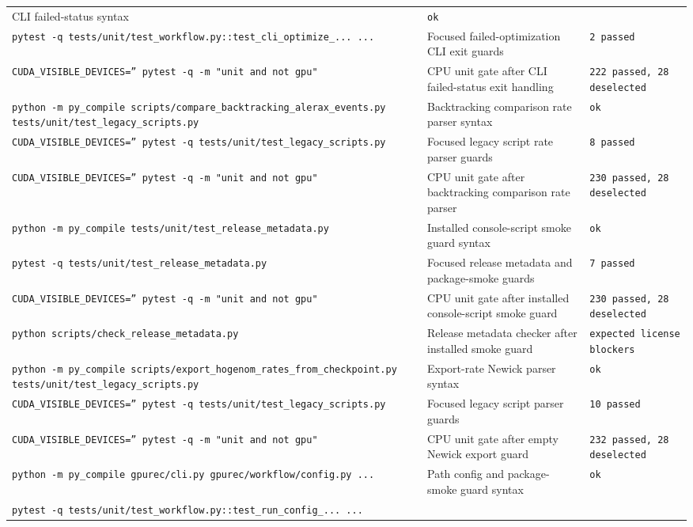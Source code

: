 \documentclass[11pt]{article}
\begin{document}
\begin{center}
\begin{tabular}{lll}
CLI failed-status syntax &
\texttt{ok} \\
\texttt{pytest -q tests/unit/test\_workflow.py::test\_cli\_optimize\_... ...} &
Focused failed-optimization CLI exit guards &
\texttt{2 passed} \\
\texttt{CUDA\_VISIBLE\_DEVICES='' pytest -q -m "unit and not gpu"} &
CPU unit gate after CLI failed-status exit handling &
\texttt{222 passed, 28 deselected} \\
\texttt{python -m py\_compile scripts/compare\_backtracking\_alerax\_events.py tests/unit/test\_legacy\_scripts.py} &
Backtracking comparison rate parser syntax &
\texttt{ok} \\
\texttt{CUDA\_VISIBLE\_DEVICES='' pytest -q tests/unit/test\_legacy\_scripts.py} &
Focused legacy script rate parser guards &
\texttt{8 passed} \\
\texttt{CUDA\_VISIBLE\_DEVICES='' pytest -q -m "unit and not gpu"} &
CPU unit gate after backtracking comparison rate parser &
\texttt{230 passed, 28 deselected} \\
\texttt{python -m py\_compile tests/unit/test\_release\_metadata.py} &
Installed console-script smoke guard syntax &
\texttt{ok} \\
\texttt{pytest -q tests/unit/test\_release\_metadata.py} &
Focused release metadata and package-smoke guards &
\texttt{7 passed} \\
\texttt{CUDA\_VISIBLE\_DEVICES='' pytest -q -m "unit and not gpu"} &
CPU unit gate after installed console-script smoke guard &
\texttt{230 passed, 28 deselected} \\
\texttt{python scripts/check\_release\_metadata.py} &
Release metadata checker after installed smoke guard &
\texttt{expected license blockers} \\
\texttt{python -m py\_compile scripts/export\_hogenom\_rates\_from\_checkpoint.py tests/unit/test\_legacy\_scripts.py} &
Export-rate Newick parser syntax &
\texttt{ok} \\
\texttt{CUDA\_VISIBLE\_DEVICES='' pytest -q tests/unit/test\_legacy\_scripts.py} &
Focused legacy script parser guards &
\texttt{10 passed} \\
\texttt{CUDA\_VISIBLE\_DEVICES='' pytest -q -m "unit and not gpu"} &
CPU unit gate after empty Newick export guard &
\texttt{232 passed, 28 deselected} \\
\texttt{python -m py\_compile gpurec/cli.py gpurec/workflow/config.py ...} &
Path config and package-smoke guard syntax &
\texttt{ok} \\
\texttt{pytest -q tests/unit/test\_workflow.py::test\_run\_config\_... ...} &

\end{tabular}
\end{center}
\end{document}

